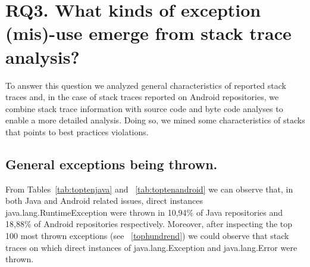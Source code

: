 \documentclass[conference]{IEEEtran}
\begin{document}




\section{RQ3.  What kinds of exception (mis)-use emerge from stack trace analysis? }

To answer this question we analyzed general characteristics of reported stack traces and, in the case of stack traces reported on Android repositories, we combine stack trace information with
source code and byte code analyses to enable a more detailed analysis.
Doing so, we mined some characteristics of stacks that points to best practices violations.

\subsection{General exceptions being thrown.}

From Tables~\ref{tab:toptenjava} and ~\ref{tab:toptenandroid} we can observe that,
in both Java and Android related issues, direct instances
java.lang.RuntimeException were thrown  in 10,94\% of Java repositories and
18,88\% of Android repositories respectively. Moreover, after inspecting the
top 100 most thrown exceptions (see ~\ref{tophundrend}) we could observe that
stack traces on which direct instances of java.lang.Exception and
java.lang.Error were thrown. 
\end{document}
